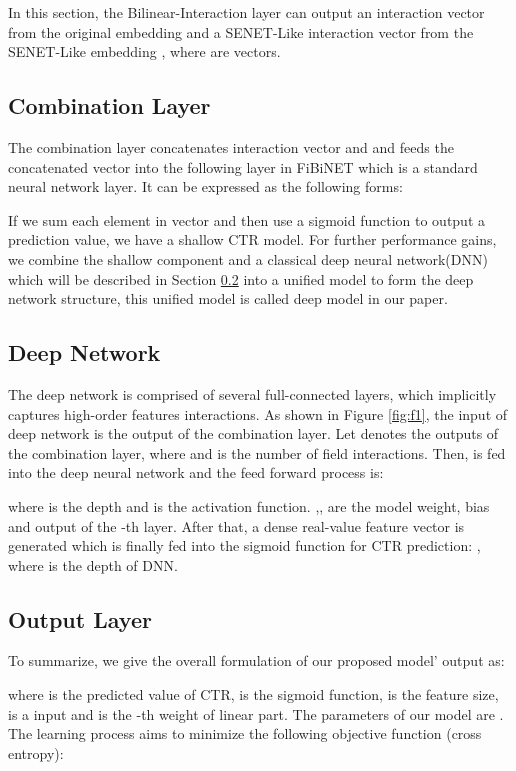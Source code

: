 \documentclass[sigconf]{acmart}
\begin{document}
In this section, the Bilinear-Interaction layer can output an
interaction vector  from the original
embedding  and a SENET-Like interaction vector
 from the SENET-Like embedding , where  are vectors.

\subsection{Combination Layer}
The combination layer concatenates interaction vector  and  and feeds the concatenated vector into the following layer in
FiBiNET which is a standard neural network layer. It can be expressed
as the following forms:


If we sum each element in vector  and then use a sigmoid function
to output a prediction value, we have a shallow CTR model. For further
performance gains, we combine the shallow component and a classical deep
neural network(DNN) which will be described in Section \ref{sec:s35} into a unified model to form the deep network
structure, this unified model is called deep model in our paper.

\subsection{Deep Network}
\label{sec:s35}
The deep network is comprised of several full-connected layers, which implicitly captures
high-order features interactions. As shown in Figure \ref{fig:f1}, the input of deep network
is the output of the combination layer. Let
 denotes the outputs of the
combination layer, where  and  is the number
of field interactions. Then,  is fed into the deep neural
network and the feed forward process is:

where  is the depth and  is the activation
function. ,, are the model weight, bias
and output of the -th layer. After that, a dense real-value feature
vector is generated which is finally fed into the sigmoid function for
CTR prediction: , where  is the depth of DNN.

\subsection{Output Layer}
To summarize, we give the overall formulation of our proposed model'
output as:


where  is the predicted value of CTR,  is
the sigmoid function,  is the feature size,  is a input and
 is the -th weight of linear part. The parameters of our model are .
The learning process aims to minimize the following objective function
(cross entropy):
\end{document}

